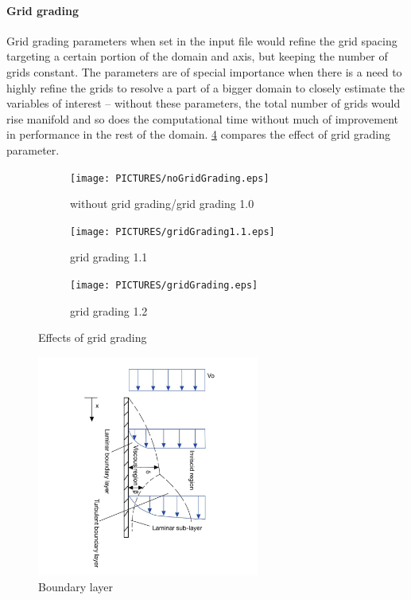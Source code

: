 \paragraph*{Grid grading}\mbox{} Grid grading parameters when set in the input file would refine the grid 
spacing targeting a certain portion of the domain and axis, but keeping the number of grids constant. 
The parameters are of special importance when there is a need to highly refine the grids to resolve a part 
of a bigger domain to closely estimate the variables of interest -- without these parameters, the total number 
of grids would rise manifold and so does the computational time without much of improvement in performance in 
the rest of the domain. \cref{fig:gridGrading} compares the effect of grid grading parameter. \\
\begin{figure}[!h]
        \centering
    \begin{subfigure}{.3\linewidth}
        \centering
        \texttt{[image: PICTURES/noGridGrading.eps]}
        \caption{without grid grading/grid grading 1.0}
        \label{fig:nogg}       %
    \end{subfigure}%
        \hfill
    \begin{subfigure}{.3\linewidth}
        \centering
        \texttt{[image: PICTURES/gridGrading1.1.eps]}
        \caption{grid grading 1.1}
        \label{fig:gg1.1}       %
    \end{subfigure}%
    \hfill
    \begin{subfigure}{.3\linewidth}
        \centering
        \texttt{[image: PICTURES/gridGrading.eps]}
        \caption{grid grading 1.2}
        \label{fig:gg1.2}       %
    \end{subfigure}%
        \hfill
     \caption{Effects of grid grading}
     \label{fig:gridGrading}
\end{figure}

\begin{figure}
    \centering
    \includegraphics[width=0.65\textwidth]{PICTURES/BL.jpg}
    \caption{Boundary layer}
    \label{fig:BL}       %
\end{figure}

